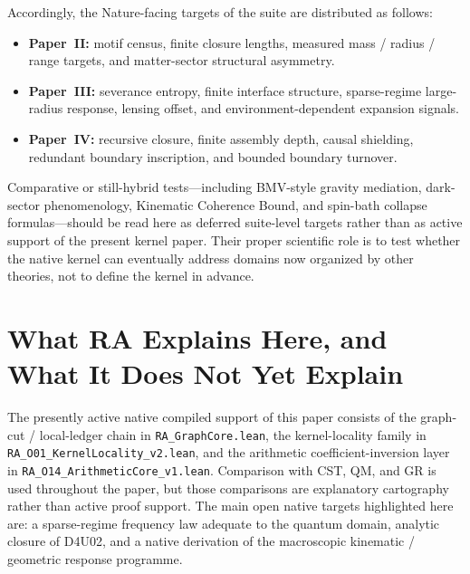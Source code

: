 \documentclass[11pt]{article}
\begin{document}
Accordingly, the Nature-facing targets of the suite are distributed as follows:
\begin{itemize}
    \item \textbf{Paper~II:} motif census, finite closure lengths, measured mass / radius / range targets, and matter-sector structural asymmetry.
    \item \textbf{Paper~III:} severance entropy, finite interface structure, sparse-regime large-radius response, lensing offset, and environment-dependent expansion signals.
    \item \textbf{Paper~IV:} recursive closure, finite assembly depth, causal shielding, redundant boundary inscription, and bounded boundary turnover.
\end{itemize}

Comparative or still-hybrid tests---including BMV-style gravity mediation, dark-sector phenomenology, Kinematic Coherence Bound, and spin-bath collapse formulas---should be read here as deferred suite-level targets rather than as active support of the present kernel paper. Their proper scientific role is to test whether the native kernel can eventually address domains now organized by other theories, not to define the kernel in advance.

\section{What RA Explains Here, and What It Does Not Yet Explain}
\label{sec:status}

\begin{tcolorbox}[title=Scope of the active native support layer,colback=gray!5,colframe=gray!60]
The presently active native compiled support of this paper consists of the graph-cut / local-ledger chain in \texttt{RA\_GraphCore.lean}, the kernel-locality family in \texttt{RA\_O01\_KernelLocality\_v2.lean}, and the arithmetic coefficient-inversion layer in \texttt{RA\_O14\_ArithmeticCore\_v1.lean}. Comparison with CST, QM, and GR is used throughout the paper, but those comparisons are explanatory cartography rather than active proof support. The main open native targets highlighted here are: a sparse-regime frequency law adequate to the quantum domain, analytic closure of D4U02, and a native derivation of the macroscopic kinematic / geometric response programme.
\end{tcolorbox}
\end{document}

